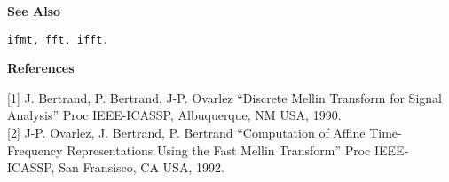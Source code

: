 {\bf \large \sf See Also}\\
\hspace*{1.5cm}
\begin{minipage}[t]{13.5cm}
\begin{verbatim}
ifmt, fft, ifft.
\end{verbatim}
\end{minipage}
\vspace*{.5cm}


{\bf \large \sf References}\\
\hspace*{1.5cm}
\begin{minipage}[t]{13.5cm}
[1] J. Bertrand, P. Bertrand, J-P. Ovarlez ``Discrete Mellin Transform for
Signal Analysis'' Proc IEEE-ICASSP, Albuquerque, NM USA, 1990.\\

[2] J-P. Ovarlez, J. Bertrand, P. Bertrand ``Computation of Affine
Time-Frequency Representations Using the Fast Mellin Transform'' Proc
IEEE-ICASSP, San Fransisco, CA USA, 1992.
\end{minipage}


